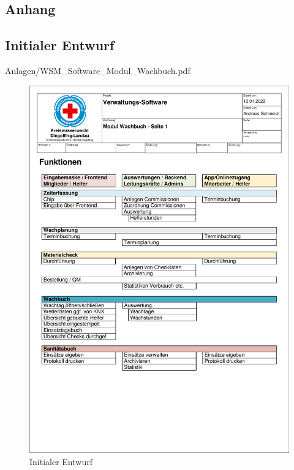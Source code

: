 \documentclass[fontsize=12pt,openright,oneside,paper=a4,BCOR=1cm]{scrbook}
\begin{document}
\renewcommand{\cleardoublepage}{}

\begin{appendix}
\chapter{Anhang}
\section{Initialer Entwurf}


    {Anlagen/WSM_Software_Modul_Wachbuch.pdf}
\begin{figure}[H]
\centering
    \includegraphics[page=3,scale=0.75]{Anlagen/WSM_Software_Modul_Wachbuch.pdf}
  \caption{Initialer Entwurf}
  \label{fig:initial}
\end{figure}


\end{appendix}
\end{document}
